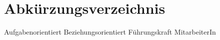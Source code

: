 

\chapter*{Abkürzungsverzeichnis}
\begin{acronym}[abbreviations]
 {Aufgabenorientiert}
 {Beziehungsorientiert}
 {Führungskraft}
 {MitarbeiterIn}
\end{acronym}


